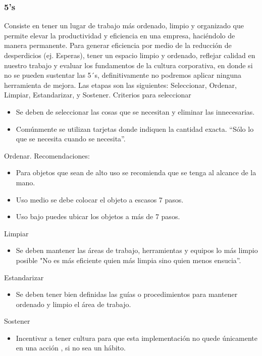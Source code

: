     \subsubsection{5's}
    Consiste en tener un lugar de trabajo
    más ordenado, limpio y organizado que
    permite elevar la productividad y
    eficiencia en una empresa, haciéndolo de
    manera permanente.
    Para generar eficiencia por medio de la
    reducción de desperdicios (ej. Esperas), tener un espacio limpio y ordenado, reflejar calidad en nuestro trabajo y evaluar los fundamentos de la cultura
    corporativa, en donde si no se pueden
    sustentar las 5´s, definitivamente no
    podremos aplicar ninguna herramienta de
    mejora.
    Las etapas son las siguientes: Seleccionar, Ordenar, Limpiar, Estandarizar, y Sostener.
    Criterios para seleccionar
    \begin{itemize}
    \item Se deben de seleccionar las cosas
    que se necesitan y eliminar las
    innecesarias.
    \item Comúnmente se utilizan tarjetas
    donde indiquen la cantidad exacta.
    “Sólo lo que se necesita cuando se
    necesita”. 
    \end{itemize}
    Ordenar. Recomendaciones:
    \begin{itemize}
    \item Para objetos que sean de alto uso se
    recomienda que se tenga al alcance
    de la mano.
    \item Uso medio se debe colocar el objeto
    a escasos 7 pasos.
    \item Uso bajo puedes ubicar los objetos a
    más de 7 pasos.
    \end{itemize}
    Limpiar
    \begin{itemize}
    \item Se deben mantener las áreas de trabajo,
    herramientas y equipos lo más limpio
    posible
    "No es más eficiente quien más limpia
    sino quien menos ensucia”.
    \end{itemize}
    Estandarizar
    \begin{itemize}
    \item Se deben tener bien definidas las guías o
    procedimientos para mantener ordenado y
    limpio el área de trabajo.
    \end{itemize}
    Sostener 
    \begin{itemize}
    \item Incentivar a tener cultura para que esta
    implementación no quede únicamente en
    una acción , si no sea un hábito.
    \end{itemize} \cite{YellowBelt}
